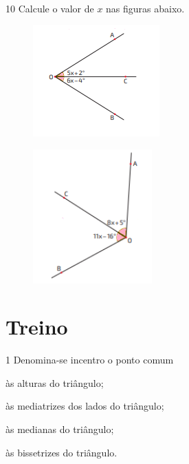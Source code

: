\\

\num{10} Calcule o valor de $x$ nas figuras abaixo.

\begin{multicols}{2}
\begin{escolha}
\item
\begin{figure}[H]
\centering\includegraphics[width=1.91667in,height=1.6875in]{./imgSAEB_8_MAT/media/image33.png}
\end{figure}  
\item
\begin{figure}[H]
\centering\includegraphics[width=1.80208in,height=2.02917in]{./imgSAEB_8_MAT/media/image34.png}
\end{figure}  
\end{escolha}
\end{multicols}

\pagebreak

\section{Treino}

\num{1} Denomina-se incentro o ponto comum

\begin{escolha}[itemsep=0pt]
\item às alturas do triângulo;
\item às mediatrizes dos lados do triângulo;
\item às medianas do triângulo;
\item às bissetrizes do triângulo. 
\end{escolha}

